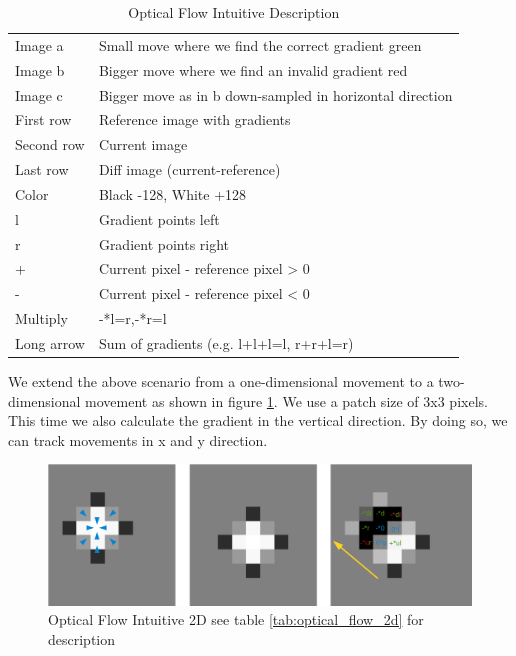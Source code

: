 \documentclass[11pt,a4paper,titlepage,oneside]{report}
\begin{document}
\begin{table}[H]
   \centering
   \begin{tabular}{l l}
      Image a & Small move where we find the correct gradient green\\
      Image b & Bigger move where we find an invalid gradient red\\
      Image c & Bigger move as in b down-sampled in horizontal direction\\
      First row & Reference image with gradients\\
      Second row & Current image\\
      Last row & Diff image (current-reference)\\
      Color & Black -128, White +128\\
      l & Gradient points left\\
      r & Gradient points right\\
      + & Current pixel - reference pixel > 0\\
      - & Current pixel - reference pixel < 0\\
      Multiply & -*l=r,-*r=l\\
      Long arrow & Sum of gradients (e.g. l+l+l=l, r+r+l=r)
   \end{tabular}
   \caption{Optical Flow Intuitive Description}
   \label{tab:optical_flow_intuitive}
\end{table}

We extend the above scenario from a one-dimensional movement to a two-dimensional movement as shown in figure \ref{fig:optical_flow_2d}. We use a patch size of 3x3 pixels. This time we also calculate the gradient in the vertical direction. By doing so, we can track movements in x and y direction.

\begin{figure}[H]
  \includegraphics[width=1.0\textwidth]{img/optical_flow_2d.png}
  \caption{Optical Flow Intuitive 2D see table \ref{tab:optical_flow_2d} for description}
  \label{fig:optical_flow_2d}
\end{figure}
\end{document}

